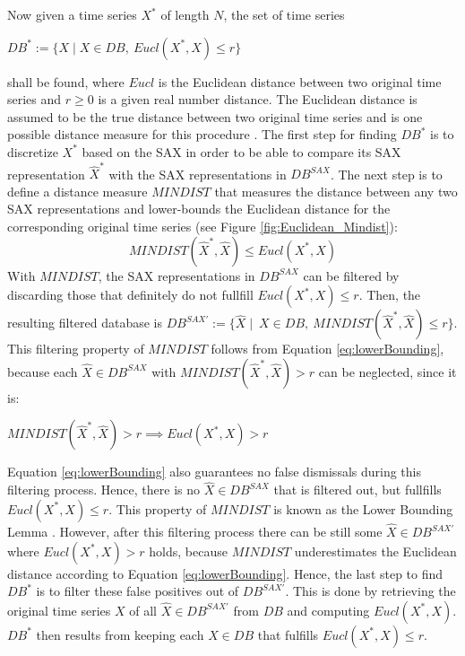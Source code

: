 Now given a time series $X^*$ of length $N$, the set of time series 
\begin{center}
$DB^* := \{X \mid X \in DB, \ Eucl(X^*, X) \leq r\}$
\end{center}
shall be found, where $Eucl$ is the Euclidean distance between two original time series and $r \geq 0$ is a given real number distance. The Euclidean distance is assumed to be the true distance between two original time series and is one possible distance measure for this procedure \cite{Survey_Esling}. \newline
The first step for finding $DB^*$ is to discretize $X^*$ based on the \ac{SAX} in order to be able to compare its \ac{SAX} representation $\hat{X}^*$ with the \ac{SAX} representations in $DB^{SAX}$. \newline
The next step is to define a distance measure $MINDIST$ that measures the distance between any two \ac{SAX} representations and lower-bounds the Euclidean distance for the corresponding original time series (see Figure \ref{fig:Euclidean_Mindist}):
\begin{equation}
MINDIST(\hat{X}^*,\hat{X}) \leq Eucl(X^*,X)
\label{eq:lowerBounding}
\end{equation}
With $MINDIST$, the \ac{SAX} representations in $DB^{SAX}$ can be filtered by discarding those that definitely do not fullfill $Eucl(X^*,X) \leq r$. Then, the resulting filtered database is $DB^{SAX'} := \{\hat{X} \mid \ X \in DB, \ MINDIST(\hat{X}^*,\hat{X}) \leq r\}$. This filtering property of $MINDIST$ follows from Equation \ref{eq:lowerBounding}, because each $\hat{X} \in DB^{SAX}$ with $MINDIST(\hat{X}^*,\hat{X}) > r$ can be neglected, since it is:
\begin{center}
$MINDIST(\hat{X}^*,\hat{X}) > r \implies Eucl(X^*,X) > r$
\end{center}
Equation \ref{eq:lowerBounding} also guarantees no false dismissals during this filtering process. Hence, there is no $\hat{X} \in DB^{SAX}$ that is filtered out, but fullfills $Eucl(X^*,X) \leq r$. This property of $MINDIST$ is known as the Lower Bounding Lemma \cite{Faloutsos_Bounding_Lemma}. \newline
However, after this filtering process there can be still some $\hat{X} \in DB^{SAX'}$ where $Eucl(X^*,X) > r$ holds, because $MINDIST$ underestimates the Euclidean distance according to Equation \ref{eq:lowerBounding}. \newline
Hence, the last step to find $DB^*$ is to filter these false positives out of $DB^{SAX'}$. This is done by retrieving the original time series $X$  of all $\hat{X} \in DB^{SAX'}$ from $DB$ and computing $Eucl(X^*,X)$. $DB^*$ then results from keeping each $X \in DB$ that fulfills $Eucl(X^*,X) \leq r$. \newline
